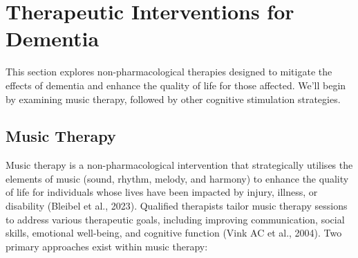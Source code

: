 \documentclass{l4proj}
\begin{document}





\section{Therapeutic Interventions for Dementia}
This section explores non-pharmacological therapies designed to mitigate the effects of dementia and enhance the quality of life for those affected. We'll begin by examining music therapy, followed by other cognitive stimulation strategies.

\subsection{Music Therapy}\label{sec:music_therapy}

Music therapy is a non-pharmacological intervention that strategically utilises the elements of music (sound, rhythm, melody, and harmony) to enhance the quality of life for individuals whose lives have been impacted by injury, illness, or disability (Bleibel et al., 2023). Qualified therapists tailor music therapy sessions to address various therapeutic goals, including improving communication, social skills, emotional well-being, and cognitive function (Vink AC et al., 2004). Two primary approaches exist within music therapy:
\end{document}

